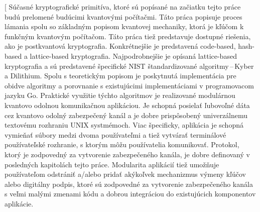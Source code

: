 
\date{7.\,6.\,2023}


\abstract[%
  Súčasné kryptografické primitíva, ktoré sú popísané na začiatku tejto práce budú prelomené budúcimi kvantovými počítačmi. Táto práca popisuje proces lámania spolu so základným popisom kvantovej mechaniky, ktorá je kľúčom k funkčným kvantovým počítačom. Táto práca tiež predstavuje dostupné riešenia, ako je postkvantová kryptografia. Konkrétnejšie je predstavená code-based, hash-based a lattice-based kryptografia. Najpodrobnejšie je opísaná lattice-based kryptografia a sú predstavené špecifické NIST štandardizované algoritmy\,--\,Kyber a Dilithium. Spolu s teoretickým popisom je poskytnutá implementácia pre obidve algoritmy a porovnanie s existujúcimi implementáciami v programovacom jazyku Go. Praktické využitie týchto algoritmov je realizované modulárnou kvantovo odolnou komunikačnou aplikáciou. Je schopná posielať ľubovoľné dáta cez kvantovo odolný zabezpečený kanál a je dobre prispôsobený univerzálnemu textovému rozhraniu UNIX systmémoch. Viac špecificky, aplikácia je schopná vymieňať súbory medzi dvoma používateľmi a tiež vytvárať terminálové používateľské rozhranie, s ktorým môžu používatelia komunikovať. Protokol, ktorý je zodpovedný za vytvorenie zabezpečeného kanála, je dobre definovaný v posledných kapitolách tejto práce. Modularita aplikácií tiež umožňuje používateľom odstrániť a/alebo pridať akýkoľvek mechanizmus výmeny kľúčov alebo digitálny podpis, ktoré sú zodpovedné za vytvorenie zabezpečeného kanála s veľmi malými zmenami kódu a dobrou integráciou do existujúcich komponentov aplikácie.
